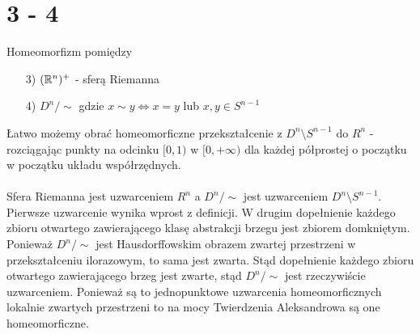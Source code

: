 \newpage
\section*{3 - 4}
Homeomorfizm pomiędzy
\begin{itemize}
  \item[3)] $({\mathbb{R}}^n)^+$ - sferą Riemanna
  \item[4)] $D ^ {n} / \sim $ gdzie $ x \sim y \iff x = y $ lub $ x, y \in S^{n-1} $
\end{itemize}
Łatwo możemy obrać homeomorficzne przekształcenie z $D^n \setminus S^{n-1}$ do $R^n$ - rozciągając punkty na odcinku $[0, 1)$ w $[0, +\infty)$ dla każdej półprostej o początku w początku układu współrzędnych.\\
\\
Sfera Riemanna jest uzwarceniem $R^n$ a $D ^ {n} / \sim $ jest uzwarceniem $D^n \setminus S^{n-1}$. Pierwsze uzwarcenie wynika wprost z definicji. W drugim dopełnienie każdego zbioru otwartego zawierającego klasę abstrakcji brzegu jest zbiorem domkniętym. Ponieważ $D ^ {n} / \sim $ jest Hausdorffowskim obrazem zwartej przestrzeni w przekształceniu ilorazowym, to sama jest zwarta. Stąd dopełnienie każdego zbioru otwartego zawierającego brzeg jest zwarte, stąd $D ^ {n} / \sim $ jest rzeczywiście uzwarceniem. Ponieważ są to jednopunktowe uzwarcenia homeomorficznych lokalnie zwartych przestrzeni to na mocy Twierdzenia Aleksandrowa są one homeomorficzne.
